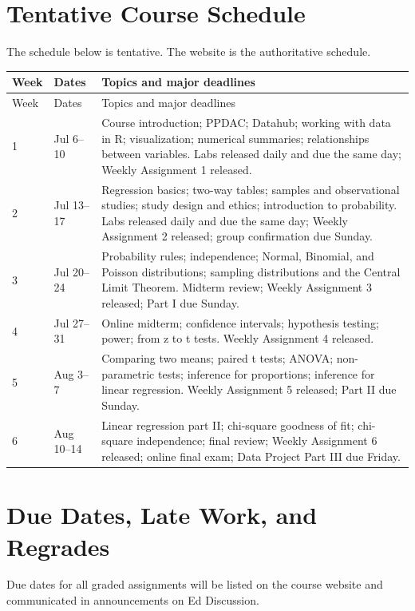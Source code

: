 \documentclass[11pt]{article}
\begin{document}
\section*{Tentative Course Schedule}

The schedule below is tentative. The website is the authoritative schedule.

\begin{longtable}{@{}p{0.55in}p{1.05in}p{4.75in}@{}}
\toprule
Week & Dates & Topics and major deadlines\\
\midrule
\endfirsthead
\toprule
Week & Dates & Topics and major deadlines\\
\midrule
\endhead
1 & Jul 6--10 & Course introduction; PPDAC; Datahub; working with data in R; visualization; numerical summaries; relationships between variables. Labs released daily and due the same day; Weekly Assignment 1 released.\\
2 & Jul 13--17 & Regression basics; two-way tables; samples and observational studies; study design and ethics; introduction to probability. Labs released daily and due the same day; Weekly Assignment 2 released; group confirmation due Sunday.\\
3 & Jul 20--24 & Probability rules; independence; Normal, Binomial, and Poisson distributions; sampling distributions and the Central Limit Theorem. Midterm review; Weekly Assignment 3 released; Part I due Sunday.\\
4 & Jul 27--31 & Online midterm; confidence intervals; hypothesis testing; power; from z to t tests. Weekly Assignment 4 released.\\
5 & Aug 3--7 & Comparing two means; paired t tests; ANOVA; non-parametric tests; inference for proportions; inference for linear regression. Weekly Assignment 5 released; Part II due Sunday.\\
6 & Aug 10--14 & Linear regression part II; chi-square goodness of fit; chi-square independence; final review; Weekly Assignment 6 released; online final exam; Data Project Part III due Friday.\\
\bottomrule
\end{longtable}

\section*{Due Dates, Late Work, and Regrades}

Due dates for all graded assignments will be listed on the course website and
communicated in announcements on Ed Discussion.
\end{document}
